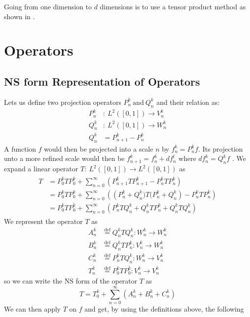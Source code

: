 \documentclass[../master_thesis.tex]{subfiles}
\begin{document}
Going from one dimension to $d$ dimensions is to use a tensor product method as shown in
\cite{Frediani:2013}.
\section{Operators}
\subsection{\ac{NS} form Representation of Operators}
Lets us define two projection operators $P^k_n \ \text{and}\ Q^k_n $  and their relation as:
\begin{align}
  P^k_n &: \ L^2([0, 1]) \to V^k_n \\
  Q^k_n &:\  L^2([0, 1]) \to W^k_n \\
  Q^k_n &= P^k_{n+1} - P^k_n
\end{align}
A function $f$ would then be projected into a scale $n$ by $ f^k_n = P^k_n f $.
Its projection unto a more refined scale would then be $ f_{n+1}^k = f^k_n + df^l_n$
where $df^k_n = Q^k_nf$ \cite{Frediani:2013}.
We expand a linear operator $T:\ L^2([0, 1]) \to L^2([0, 1])$ as
\begin{align}
  \begin{split}
    T &= P^k_0TP^k_0 + \sum^\infty_{n=0}\left( P^k_{n+1}TP^k_{n+1} - P^k_nTP^k_n\right)\\
      &=  P^k_0TP^k_0 + \sum^\infty_{n=0}\left(\left(P^k_{n}+Q^k_{n})T(P^k_{n}+Q^k_{n}\right) - P^k_nTP^k_n\right)\\
      &= P^k_0TP^k_0 + \sum^\infty_{n=0}\left(P^k_nTQ^k_n + Q^k_nTP^k_n + Q^k_nTQ^k_n\right)
  \end{split}
\end{align}
We represent the operator $T$ as
\begin{align}
  A^k_n & \stackrel{\text{def}}{=}Q^k_nTQ^k_n: W_n^k \to W_n^k\\
  B^k_n & \stackrel{\text{def}}{=}Q^k_nTP^k_n: V_n^k \to W_n^k\\
  C^k_n & \stackrel{\text{def}}{=}P^k_nTQ^k_n: W_n^k \to V_n^k\\
  T^k_n & \stackrel{\text{def}}{=}P^k_0TP^k_0: V_n^k \to V_n^k
\end{align}
so we can write the \ac{NS} form of the operator $T$ as \cite{Frediani:2013, Beylkin1999AdaptiveSO}
\begin{equation}
  T = T^k_0 + \sum^\infty_{n=0}\left( A^k_n + B^k_n + C^k_n\right)
\end{equation}
We can then apply $T$ on $f$ and get, by using the definitions above, the following
\end{document}

